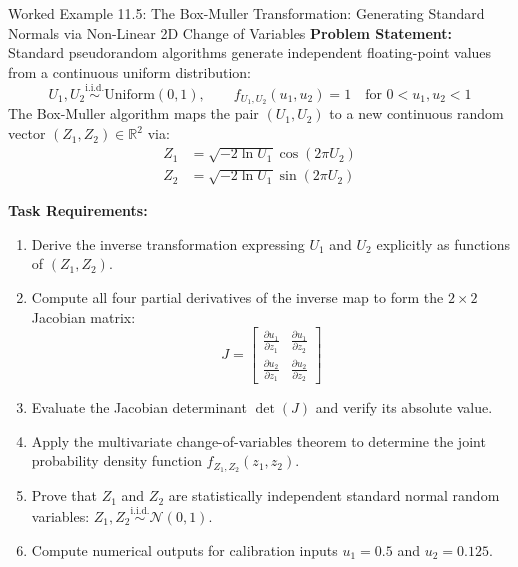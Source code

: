 \begin{examplebox}[breakable]{Worked Example 11.5: The Box-Muller Transformation: Generating Standard Normals via Non-Linear 2D Change of Variables}
\textbf{Problem Statement:}
Standard pseudorandom algorithms generate independent floating-point values from a continuous uniform distribution:
\begin{equation}
U_1, U_2 \stackrel{\text{i.i.d.}}{\sim} \text{Uniform}(0, 1), \qquad f_{U_1, U_2}(u_1, u_2) = 1 \quad \text{for } 0 < u_1, u_2 < 1
\end{equation}
The Box-Muller algorithm maps the pair $(U_1, U_2)$ to a new continuous random vector $(Z_1, Z_2) \in \mathbb{R}^2$ via:
\begin{align}
Z_1 &= \sqrt{-2\ln U_1}\cos(2\pi U_2) \label{eq:box_muller_z1} \\
Z_2 &= \sqrt{-2\ln U_1}\sin(2\pi U_2) \label{eq:box_muller_z2}
\end{align}

\textbf{Task Requirements:}
\begin{enumerate}
    \item Derive the inverse transformation expressing $U_1$ and $U_2$ explicitly as functions of $(Z_1, Z_2)$.
    \item Compute all four partial derivatives of the inverse map to form the $2 \times 2$ Jacobian matrix:
    \begin{equation*}
    J = \begin{bmatrix} \frac{\partial u_1}{\partial z_1} & \frac{\partial u_1}{\partial z_2} \\ \frac{\partial u_2}{\partial z_1} & \frac{\partial u_2}{\partial z_2} \end{bmatrix}
    \end{equation*}
    \item Evaluate the Jacobian determinant $\det(J)$ and verify its absolute value.
    \item Apply the multivariate change-of-variables theorem to determine the joint probability density function $f_{Z_1, Z_2}(z_1, z_2)$.
    \item Prove that $Z_1$ and $Z_2$ are statistically independent standard normal random variables: $Z_1, Z_2 \stackrel{\text{i.i.d.}}{\sim} \mathcal{N}(0, 1)$.
    \item Compute numerical outputs for calibration inputs $u_1 = 0.5$ and $u_2 = 0.125$.
\end{enumerate}

\tcblower


\end{examplebox}
